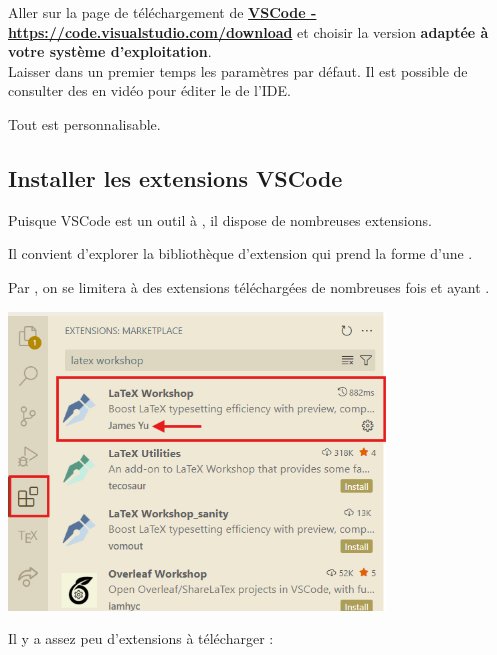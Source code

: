 \begin{tcbenumerate}[3]
    \tcbitem Aller sur la page de téléchargement de \href{https://code.visualstudio.com/download}{\bfseries\color{monrose}VSCode - https://code.visualstudio.com/download} et choisir la version \textbf{adaptée à votre système d'exploitation}.\\
    \tcbitem Laisser dans un premier temps les paramètres par défaut.
    \tcbitem Il est possible de consulter des  en vidéo pour éditer le  de l'IDE. 

    Tout est personnalisable.
\end{tcbenumerate}



\subsection{Installer les extensions VSCode}



\begin{MultiColonnes}{2}
    \tcbitem Puisque VSCode est un outil à , il dispose de nombreuses extensions. 

Il convient d'explorer la bibliothèque d'extension qui prend la forme d'une . 

Par , on se limitera à des extensions téléchargées de nombreuses fois et ayant . 

    \tcbitem[halign=center] \includegraphics[width=0.75\textwidth]{images/IDE/extension_marketplace.png}
\end{MultiColonnes}


Il y a assez peu d'extensions à télécharger : 

